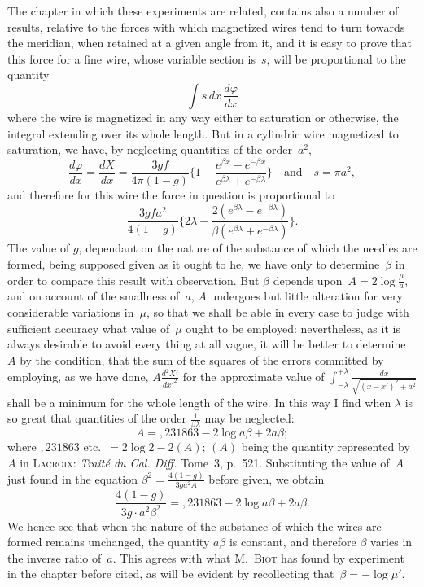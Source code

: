 \documentclass[11pt,notitlepage]{amsart}
\let\Person\textsc
\let\Title\textit
\renewcommand{\phi}{\varphi}
\begin{document}
The chapter in which these experiments are related, contains also a
number of results, relative to the forces with which magnetized wires tend
to turn towards the meridian, when retained at a given angle from it, and
it is easy to prove that this force for a fine wire,
whose variable section is~$s$,
will be proportional to the quantity
\[
\int s\,dx\,\frac{d\phi}{dx}
\]
where the wire is magnetized in any way either to saturation or otherwise,
the integral extending over its whole length. But in a cylindric wire 
magnetized to saturation, we have, by neglecting quantities of the order~$a^2$,
\[
\frac{d\phi}{dx}=\frac{dX}{dx}=
\frac{3gf}{4\pi(1-g)}\biggl\{1-
\frac{e^{\beta x}-e^{-\beta x}}{e^{\beta\lambda}+e^{-\beta\lambda}}\biggr\}
\quad\text{and}\quad
s=\pi a^2,
\]
and therefore for this wire the force in question is proportional to
\[
\frac{3gfa^2}{4(1-g)}\biggl\{2\lambda-
\frac{2(e^{\beta\lambda}-e^{-\beta\lambda})}
{\beta(e^{\beta\lambda}+e^{-\beta\lambda})}\biggr\}.
\]
The value of $g$, dependant on the nature of the substance of which
the needles are formed, being supposed given as it ought to he, we have only
to determine~$\beta$ in order to compare this result with observation.
But $\beta$
depends upon~$A=2\log\frac{\mu}{a}$,
and on account of the smallness of~$a$, $A$ undergoes
but little alteration for very considerable variations in~$\mu$, so that we
shall be able in every case to judge with sufficient accuracy what value 
of~$\mu$
ought to be employed: nevertheless, as it is always desirable to avoid every
thing at all vague, it will be better to determine~$A$ by the condition, that
the sum of the squares of the errors committed by employing, as we have
done, $A\frac{d^2X'}{dx'^2}$ for the approximate
value of $\int_{-\lambda}^{+\lambda}\frac{dx}{\sqrt{(x-x')^2+a^2}}$
shall be a minimum for the whole length of the wire.
In this way I find when $\lambda$ is so
great that quantities of the order $\frac{1}{\beta\lambda}$ may be neglected:
\[
A = ,231863-2\log a\beta+2a\beta;
\]
where $,231863$ etc.\ $= 2\log2-2(A)$; $(A)$ being the quantity represented
by~$A$ in \Person{Lacroix}: \Title{Trait\'e du Cal. Diff.}
Tome~3, p.~521. Substituting the value
of~$A$ just found in the equation $\beta^2=\frac{4(1-g)}{3ga^2A}$
before given, we obtain
\[
\frac{4(1-g)}{3g\cdot a^2\beta^2}=,231863-2\log a\beta+2a\beta.
\]
We hence see that when the nature of the substance of which the wires are
formed remains unchanged, the quantity $a\beta$ is constant,
and therefore $\beta$ varies
in the inverse ratio of~$a$. This agrees with
what M.~\Person{Biot} has found by experiment
in the chapter before cited, as will be evident by recollecting
that~$\beta=-\log\mu'$.
\end{document}

